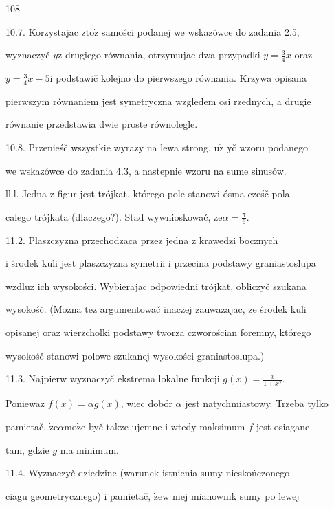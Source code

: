 \documentclass[a4paper,12pt]{article}
\begin{document}
108

10.7. Korzystajac $\mathrm{z}\mathrm{t}\mathrm{o}\dot{\mathrm{z}}$ samości podanej we wskazówce do zadania 2.5,

wyznaczyč $y\mathrm{z}$ drugiego równania, otrzymujac dwa przypadki $y=\displaystyle \frac{3}{4}x$ oraz

$y= \displaystyle \frac{3}{4}x-5\mathrm{i}$ podstawič kolejno do pierwszego równania. Krzywa opisana

pierwszym równaniem jest symetryczna wzgledem osi rzednych, a drugie

równanie przedstawia dwie proste równolegle.

10.8. Przenieśč wszystkie wyrazy na lewa strong, $\mathrm{u}\dot{\mathrm{z}}$ yč wzoru podanego

we wskazówce do zadania 4.3, a nastepnie wzoru na sume sinusów.

ll.l. Jedna $\mathrm{z}$ figur jest trójkat, którego pole stanowi ósma cześč pola

calego trójkata (dlaczego?). Stad wywnioskowač, $\displaystyle \dot{\mathrm{z}}\mathrm{e}\alpha=\frac{\pi}{6}.$

11.2. Plaszczyzna przechodzaca przez jedna $\mathrm{z}$ krawedzi bocznych

$\mathrm{i}$ środek kuli jest plaszczyzna symetrii $\mathrm{i}$ przecina podstawy graniastoslupa

wzdluz ich wysokości. Wybierajac odpowiedni trójkat, obliczyč szukana

wysokośč. (Mozna $\mathrm{t}\mathrm{e}\dot{\mathrm{z}}$ argumentowač inaczej zauwazajac, $\dot{\mathrm{z}}\mathrm{e}$ środek kuli

opisanej oraz wierzcholki podstawy tworza czworościan foremny, którego

wysokośč stanowi polowe szukanej wysokości graniastoslupa.)

11.3. Najpierw wyznaczyč ekstrema lokalne funkcji $g(x) = \displaystyle \frac{x}{1+x^{2}}.$

Poniewaz $f(x) = \alpha g(x)$, wiec dobór $\alpha$ jest natychmiastowy. Trzeba tylko

pamietač, $\dot{\mathrm{z}}\mathrm{e}\alpha \mathrm{m}\mathrm{o}\dot{\mathrm{z}}\mathrm{e}$ byč takze ujemne $\mathrm{i}$ wtedy maksimum $f$ jest osiagane

tam, gdzie $g$ ma minimum.

11.4. Wyznaczyč dziedzine (warunek istnienia sumy nieskończonego

ciagu geometrycznego) $\mathrm{i}$ pamietač, $\dot{\mathrm{z}}\mathrm{e} \mathrm{w}$ niej mianownik sumy po lewej
\end{document}
